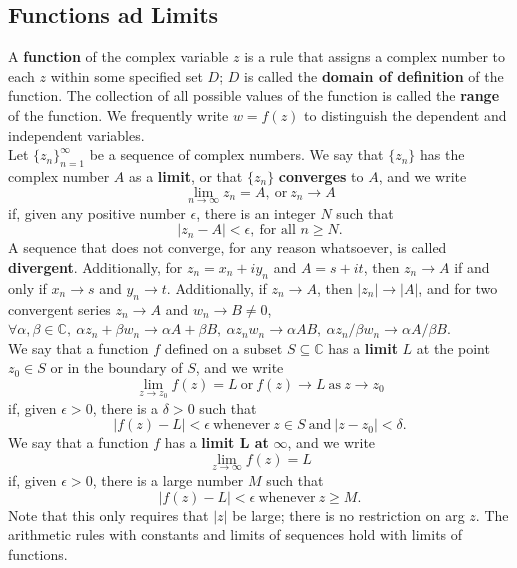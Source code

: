 \documentclass[12pt,letterpaper]{article}
\begin{document}
\subsection{Functions ad Limits}

A \textbf{function} of the complex variable \(z\) is a rule that assigns a complex number to each \(z\) within some specified set \(D\); \(D\) is called the \textbf{domain of definition} of the function. The collection of all possible values of the function is called the \textbf{range} of the function. We frequently write \(w = f(z)\) to distinguish the dependent and independent variables. \\

Let \(\{z_{n}\}_{n=1}^{\infty}\) be a sequence of complex numbers. We say that \(\{z_{n}\}\) has the complex number \(A\) as a \textbf{limit}, or that \(\{z_{n}\}\) \textbf{converges} to \(A\), and we write \[\lim_{n \to \infty} z_{n} = A,\ \text{or}\ z_{n} \to A\] if, given any positive number \(\epsilon\), there is an integer \(N\) such that \[|z_{n} - A| < \epsilon,\ \text{for all } n \geq N.\] A sequence that does not converge, for any reason whatsoever, is called \textbf{divergent}. Additionally, for \(z_{n} = x_{n} + iy_{n}\) and \(A = s + it\), then \(z_{n} \to A\) if and only if \(x_{n} \to s\) and \(y_{n} \to t\). Additionally, if \(z_{n} \to A\), then \(|z_{n}| \to |A|\), and for two convergent series \(z_{n} \to A\) and \(w_{n} \to B \neq 0\), \(\forall \alpha,\beta \in \mathbb{C},\ \alpha z_{n} + \beta w_{n} \to \alpha A + \beta B,\ \alpha z_{n} w_{n} \to \alpha AB,\ \alpha z_{n}/\beta w_{n} \to \alpha A / \beta B\). \\

We say that a function \(f\) defined on a subset \(S \subseteq \mathbb{C}\) has a \textbf{limit} \(L\) at the point \(z_{0} \in S\) or in the boundary of \(S\), and we write \[\lim_{z \to z_{0}} f(z) = L\ \text{or}\ f(z) \to L\ \text{as}\ z \to z_{0}\] if, given \(\epsilon > 0\), there is a \(\delta > 0\) such that \[|f(z) - L| < \epsilon\ \text{whenever}\ z \in S\ \text{and}\ |z - z_{0}| < \delta.\] We say that a function \(f\) has a \textbf{limit L at} \(\infty\), and we write \[\lim_{z \to \infty} f(z) = L\] if, given \(\epsilon > 0\), there is a large number \(M\) such that \[|f(z) - L| < \epsilon\ \text{whenever}\ z \geq M.\] Note that this only requires that \(|z|\) be large; there is no restriction on arg \(z\). The arithmetic rules with constants and limits of sequences hold with limits of functions. \\
\end{document}
